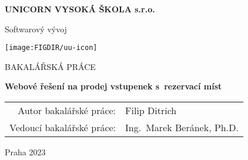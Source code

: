 \pagestyle{empty}
\begin{center}

{\bfseries\large UNICORN VYSOKÁ ŠKOLA s.r.o.}

    \vspace{5mm}

    {\Large Softwarový vývoj}

    \vfill
    \vspace{5mm}

    \centerline{\mbox{\texttt{[image: \\FIGDIR/uu-icon]}}}

    \vfill
    \vspace{5mm}

    {\large\MakeUppercase{Bakalářská práce}}

    \vspace{15mm}

    {\LARGE\bfseries Webové řešení na prodej vstupenek s~rezervací míst}

    \vfill

    \begin{tabular}{rl}
        Autor bakalářské práce: & Filip Ditrich\\
        \noalign{\vspace{2mm}}
        Vedoucí bakalářské práce: & Ing.\ Marek Beránek, Ph.D.\\
    \end{tabular}

    \vfill

    Praha 2023

\end{center}

